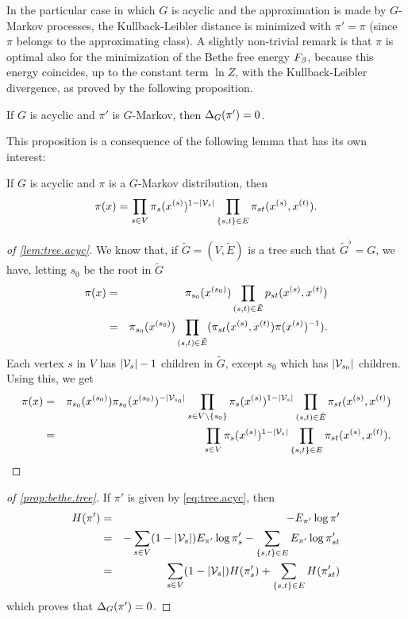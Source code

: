 In the particular case in which $G$
is acyclic and the approximation is made by $G$-Markov
processes, the Kullback-Leibler distance is
minimized with $\pi'=\pi$ (since $\pi$ belongs to the approximating
class). A slightly non-trivial remark is that $\pi$ is optimal also
for the minimization of the Bethe free energy $F_\beta$, because this
energy coincides, up to the constant term $\ln Z$, with the
Kullback-Leibler divergence, as proved by the following proposition.
\begin{proposition}
\label{prop:bethe.tree}
If $G$ is acyclic and $\pi'$ is $G$-Markov, then $\Delta_G(\pi')  = 0$.
\end{proposition}
This proposition is a consequence of the following lemma that has
its own interest:
\begin{lemma}
\label{lem:tree.acyc}
If $G$ is acyclic and $\pi$ is a $G$-Markov distribution, then
\begin{equation}
\label{eq:tree.acyc}
\pi(x) = \prod_{s\in V} \pi_s(x^{(s)})^{1-|{\mathcal V}_s|}
\prod_{\left\{ s,t \right\}\in E}
\pi_{st}(x^{(s)}, x^{(t)}).
\end{equation}
\end{lemma}
\begin{proof}[of  \cref{lem:tree.acyc}]
We know that, if $\tilde G = (V, \tilde E)$ is a tree such that
$\tilde G^\flat = G$, we have, letting $s_0$ be the root in $\tilde
G$
\begin{eqnarray*}
\pi(x) &=& \pi_{s_0}(x^{(s_0)}) \prod_{(s,t)\in \tilde E}
p_{st}(x^{(s)}, x^{(t)})\\
&=& \pi_{s_0}(x^{(s_0)}) \prod_{(s,t)\in \tilde E} (\pi_{st}(x^{(s)}, x^{(t)})
\pi(x^{(s)})^{-1}).
\end{eqnarray*}
Each vertex $s$ in $V$ has $|{\mathcal V}_s|-1$ children in $\tilde G$, except
$s_0$ which has $|{\mathcal V}_{s_0}|$ children. Using this, we get
\begin{eqnarray*}
\pi(x) &=& \pi_{s_0}(x^{(s_0)}) \pi_{s_0}(x^{(s_0)})^{-|{\mathcal V}_{s_0}|}
\prod_{s\in V\setminus \{s_0\}} \pi_s(x^{(s)})^{1-|{\mathcal V}_s|} \prod_{(s,t)\in \tilde E} \pi_{st}(x^{(s)}, x^{(t)})\\
&=& \prod_{s\in V} \pi_s(x^{(s)})^{1-|{\mathcal V}_s|} \prod_{\left\{ s,t \right\}\in  E} \pi_{st}(x^{(s)}, x^{(t)}).
\end{eqnarray*}
\end{proof}
\begin{proof}[of  \cref{prop:bethe.tree}]
If $\pi'$ is given by \cref{eq:tree.acyc}, then
\begin{eqnarray*}
H(\pi') &=& - E_{\pi'} \log \pi'\\
&=& - \sum_{s\in V} (1-|{\mathcal V}_s|) E_{\pi'} \log\pi'_s -
\sum_{\left\{ s,t \right\}\in E} E_{\pi'}\log \pi'_{st}\\
&=& \sum_{s\in V} (1-|{\mathcal V}_s|) H(\pi'_s) +
\sum_{\left\{ s,t \right\}\in E} H(\pi'_{st})
\end{eqnarray*}
which proves that $\Delta_G(\pi') = 0$.
\end{proof}


